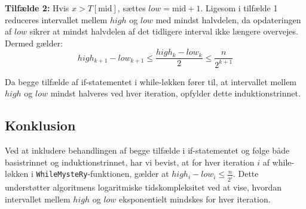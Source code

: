 \documentclass{article}
\begin{document}
\textbf{Tilfælde 2:} Hvis $x > T[\text{mid}]$, sættes $low = \text{mid} + 1$. Ligesom i tilfælde 1 reduceres intervallet mellem $high$ og $low$ med mindst halvdelen, da opdateringen af $low$ sikrer at mindst halvdelen af det tidligere interval ikke længere overvejes. Dermed gælder:
\begin{equation}
high_{k+1} - low_{k+1} \leq \frac{high_k - low_k}{2} \leq \frac{n}{2^{k+1}}
\end{equation}

Da begge tilfælde af if-statementet i while-løkken fører til, at intervallet mellem $high$ og $low$ mindst halveres ved hver iteration, opfylder dette induktionstrinnet.

\subsection*{Konklusion}

Ved at inkludere behandlingen af begge tilfælde i if-statementet og følge både basistrinnet og induktionstrinnet, har vi bevist, at for hver iteration $i$ af while-løkken i \texttt{WhileMysteRy}-funktionen, gælder at $high_i - low_i \leq \frac{n}{2^i}$. Dette understøtter algoritmens logaritmiske tidskompleksitet ved at vise, hvordan intervallet mellem $high$ og $low$ eksponentielt mindskes for hver iteration.
\end{document}
